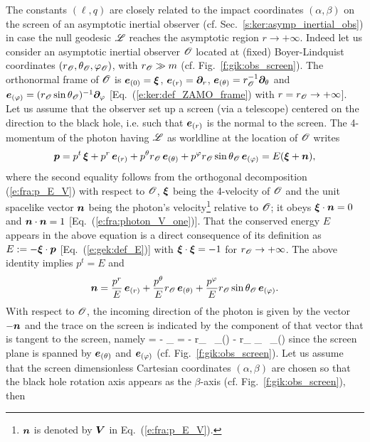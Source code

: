 The constants $(\ell,q)$ are closely related to the impact coordinates $(\alpha,\beta)$
on the screen of an asymptotic inertial observer (cf. Sec.~\ref{s:ker:asymp_inertial_obs})
in case the null geodesic $\mathscr{L}$ reaches the asymptotic region $r\to +\infty$.
Indeed let us consider an asymptotic inertial observer $\mathscr{O}$ located at (fixed) Boyer-Lindquist
coordinates $(r_{\mathscr{O}}, \theta_{\mathscr{O}}, \varphi_{\mathscr{O}})$, with $r_{\mathscr{O}} \gg m$ (cf. Fig.~\ref{f:gik:obs_screen}).
The orthonormal frame of $\mathscr{O}$ is $\bm{e}_{(0)} =\bm{\xi}$, $\bm{e}_{(r)} = \bm{\partial}_r$,
$\bm{e}_{(\theta)} = r_{\mathscr{O}}^{-1} \bm{\partial}_\theta$ and $\bm{e}_{(\varphi)} = (r_{\mathscr{O}}\sin\theta_{\mathscr{O}})^{-1} \bm{\partial}_\varphi$
[Eq.~(\ref{e:ker:def_ZAMO_frame}) with $r = r_{\mathscr{O}}\to +\infty$].
Let us assume that the observer set up a screen (via a telescope) centered on the direction to the
black hole, i.e. such that $\bm{e}_{(r)}$ is the normal to the screen. The 4-momentum of the photon
having $\mathscr{L}$ as worldline at the location of $\mathscr{O}$ writes
\[
    \bm{p} = p^t \, \bm{\xi} + p^r \, \bm{e}_{(r)} + p^\theta r_{\mathscr{O}} \, \bm{e}_{(\theta)}
    + p^\varphi r_{\mathscr{O}} \sin\theta_{\mathscr{O}} \, \bm{e}_{(\varphi)} =  E (\bm{\xi} + \bm{n}) ,
\]
where the second equality follows from the orthogonal decomposition (\ref{e:fra:p_E_V}) with respect to
$\mathscr{O}$, $\bm{\xi}$ being the 4-velocity of $\mathscr{O}$ and the unit spacelike vector $\bm{n}$ being the photon's velocity\footnote{$\bm{n}$ is denoted by $\bm{V}$ in Eq.~(\ref{e:fra:p_E_V}).} relative to $\mathscr{O}$; it
obeys $\bm{\xi}\cdot\bm{n} = 0$ and $\bm{n}\cdot\bm{n} = 1$ [Eq.~(\ref{e:fra:photon_V_one})].
That the conserved energy $E$ appears in the above equation is a direct consequence of its
definition as $E := - \bm{\xi}\cdot \bm{p}$ [Eq.~(\ref{e:gek:def_E})] with $\bm{\xi}\cdot\bm{\xi} = -1$
for $r_{\mathscr{O}}\to +\infty$. The above identity implies
$p^t = E$ and
\[
    \bm{n} = \frac{p^r}{E} \, \bm{e}_{(r)} + \frac{p^\theta}{E} r_{\mathscr{O}} \, \bm{e}_{(\theta)}
    + \frac{p^\varphi}{E} r_{\mathscr{O}} \sin\theta_{\mathscr{O}} \, \bm{e}_{(\varphi)} .
\]
With respect to $\mathscr{O}$, the incoming direction of the photon is given by
the vector $-\bm{n}$ and the trace on the screen is indicated by the component of that
vector that is tangent to the screen, namely
\be \label{e:gik:m_screen_p}
     = - _{\parallel} = -  r_{\Obs} \, _{(\th)}
    -   r_{\Obs} \sin\th_{\Obs} \, _{(\ph)}
\ee
since the screen plane is spanned by $\bm{e}_{(\theta)}$ and $\bm{e}_{(\varphi)}$
(cf. Fig.~\ref{f:gik:obs_screen}). Let us assume that the screen dimensionless
Cartesian coordinates $(\alpha,\beta)$ are chosen so that the black hole rotation axis
appears as the $\beta$-axis (cf. Fig.~\ref{f:gik:obs_screen}), then
